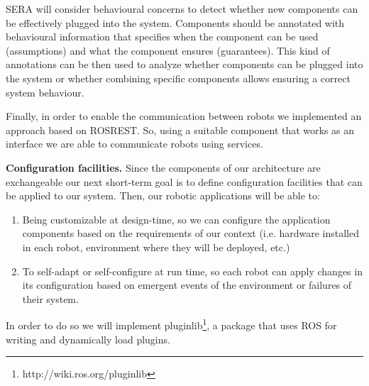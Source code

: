 SERA will consider behavioural concerns to detect whether new components can be effectively plugged into the system. 
Components should be annotated with behavioural information that specifies when the component can be used (assumptions) and what the component ensures (guarantees). 
This kind of annotations can be then used to analyze whether components can be plugged into the system or whether combining specific components allows ensuring a correct system behaviour. 

Finally, in order to enable the communication between robots we implemented an approach based on ROSREST.
So, using a suitable component that works as an interface we are able to communicate robots using services.

\textbf{Configuration facilities.}
Since the components of our architecture are exchangeable our next short-term goal is to define configuration facilities that can be applied to our system. %
Then, our robotic applications will be able to:

\begin{enumerate}
\item Being customizable at design-time, so we can configure the application components based on the requirements of our context (i.e. hardware installed in each robot, environment where they will be deployed, etc.)
\item To self-adapt or self-configure at run time, so each robot can apply changes in its configuration based on emergent events of the environment or failures of their system.
\end{enumerate}

In order to do so we will implement pluginlib\footnote{http://wiki.ros.org/pluginlib}, a package that uses ROS for writing and dynamically load plugins. %



